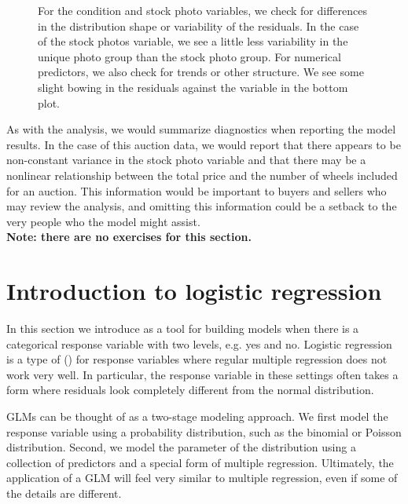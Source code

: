 \begin{description}
\begin{figure}
  \centering
  \caption{For the condition and stock photo variables, we check
      for differences in the distribution shape or variability of
      the residuals.
      In the case of the stock photos variable, we see a little
      less variability in the unique photo group than the stock
      photo group.
      For numerical predictors, we also check for trends or other
      structure.
      We see some slight bowing in the residuals against the
       variable in the bottom plot.}
  \label{mkDiagnosticEvsVariables}
\end{figure}

\end{description}

As with the  analysis, we would summarize
diagnostics when reporting the model results.
In the case of this auction data,
we would report that there appears to be non-constant variance
in the stock photo variable and that there may be a nonlinear
relationship between the total price and the number of wheels
included for an auction.
This information would be important to buyers and sellers who
may review the analysis, and omitting this information could be
a setback to the very people who the model might assist. \\

\noindent%
\textbf{Note: there are no exercises for this section.}




\section{Introduction to logistic regression}
\label{logisticRegression}


\noindent%
In this section we introduce
as a tool for building models when there is a categorical
response variable with two levels, e.g. yes and no.
Logistic regression is a type of
 ()
for response variables
where regular multiple regression does not work very well.
In particular, the response variable in these settings often
takes a form where residuals look completely different from
the normal distribution.

GLMs can be thought of as a two-stage modeling approach.
We first model the response variable using a probability
distribution, such as the binomial or Poisson distribution.
Second, we model the parameter of the distribution using
a collection of predictors and a special form of multiple
regression.
Ultimately, the application of a GLM will feel very similar
to multiple regression, even if some of the details are
different.

